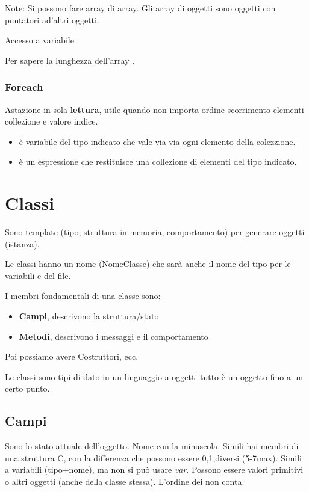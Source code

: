 Note: Si possono fare array di array. Gli array di oggetti sono oggetti con puntatori ad'altri oggetti.

Accesso a variabile .

Per sapere la lunghezza dell'array .

\subsubsection{Foreach}
Astazione  in sola \textbf{lettura}, utile quando non importa ordine scorrimento elementi collezione e valore indice.

\begin{itemize}
	\item {} è variabile del tipo indicato che vale via via ogni elemento della colezzione.
	\item {} è un espressione che restituisce una collezione di elementi del tipo indicato.
\end{itemize}






\section{Classi}
Sono template (tipo, struttura in memoria, comportamento) per generare oggetti (istanza).

Le classi hanno un nome (NomeClasse) che sarà anche il nome del tipo per le variabili e del file.

I membri fondamentali di una classe sono:
\begin{itemize}
	\item \textbf{Campi}, descrivono la struttura/stato
	\item \textbf{Metodi}, descrivono i messaggi e il comportamento
\end{itemize}
Poi possiamo avere Costruttori, ecc.

Le classi sono tipi di dato in un linguaggio a oggetti tutto è un oggetto fino a un certo punto.


\subsection{Campi}
Sono lo stato attuale dell'oggetto. Nome con la minuscola.
Simili hai membri di una struttura C, con la differenza che possono essere 0,1,diversi (5-7max). Simili a variabili (tipo+nome), ma non si può usare \textit{var}.
Possono essere valori primitivi o altri oggetti (anche della classe stessa).
L'ordine dei non conta.

